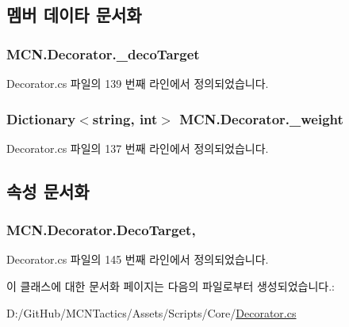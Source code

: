 \subsection{멤버 데이타 문서화}
\subsubsection[{\texorpdfstring{\+\_\+deco\+Target}{_decoTarget}}]{ M\+C\+N.\+Decorator.\+\_\+deco\+Target\hspace{0.3cm}{\ttfamily [private]}}\hypertarget{class_m_c_n_1_1_decorator_a1ec6050ce16016f709aa8e8c19444678}{}\label{class_m_c_n_1_1_decorator_a1ec6050ce16016f709aa8e8c19444678}


Decorator.\+cs 파일의 139 번째 라인에서 정의되었습니다.

\subsubsection[{\texorpdfstring{\+\_\+weight}{_weight}}]{\setlength{\rightskip}{0pt plus 5cm}Dictionary$<$string, int$>$ M\+C\+N.\+Decorator.\+\_\+weight\hspace{0.3cm}{\ttfamily [private]}}\hypertarget{class_m_c_n_1_1_decorator_a1f9dd0c30a2fc261b7987d3ce36d8673}{}\label{class_m_c_n_1_1_decorator_a1f9dd0c30a2fc261b7987d3ce36d8673}


Decorator.\+cs 파일의 137 번째 라인에서 정의되었습니다.



\subsection{속성 문서화}
\subsubsection[{\texorpdfstring{Deco\+Target}{DecoTarget}}]{ M\+C\+N.\+Decorator.\+Deco\+Target\hspace{0.3cm}{\ttfamily [get]}, {\ttfamily [protected]}}\hypertarget{class_m_c_n_1_1_decorator_a1306a0a8b814650cd5970a1ffc7ba2fe}{}\label{class_m_c_n_1_1_decorator_a1306a0a8b814650cd5970a1ffc7ba2fe}


Decorator.\+cs 파일의 145 번째 라인에서 정의되었습니다.



이 클래스에 대한 문서화 페이지는 다음의 파일로부터 생성되었습니다.\+:\begin{DoxyCompactItemize}
\item 
D\+:/\+Git\+Hub/\+M\+C\+N\+Tactics/\+Assets/\+Scripts/\+Core/\hyperlink{_decorator_8cs}{Decorator.\+cs}\end{DoxyCompactItemize}

